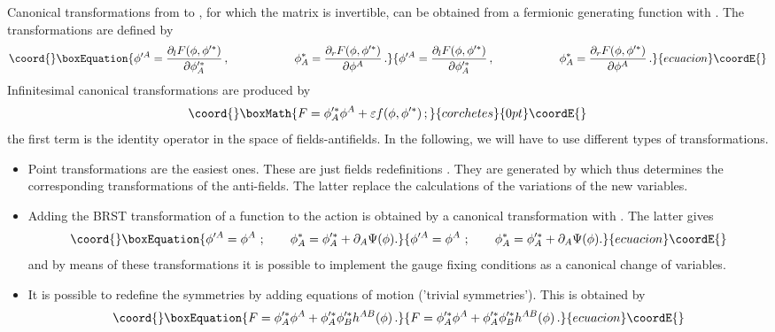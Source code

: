 \documentclass[a4paper,12pt]{article}
\begin{document}
Canonical transformations from \myHighlight{$\{\phi\, , \phi ^*\}$}\coordHE{} to \coordHE{},  
for which the matrix \coordHE{} 
is invertible, can be obtained from a fermionic generating 
function \coordHE{} with \coordHE{}. The transformations are
defined by 
\begin{equation}\coord{}\boxEquation{ \phi'^A=\frac{\partial_l F(\phi , \phi'^*)
}{\partial \phi'^*_A} \, , \hspace{2cm}
\phi^*_A=\frac{\partial_r F(\phi , \phi'^*)}{\partial \phi ^A}\,.
\label{Fcan}
}{ \phi'^A=\frac{\partial_l F(\phi , \phi'^*)
}{\partial \phi'^*_A} \, , \hspace{2cm}
\phi^*_A=\frac{\partial_r F(\phi , \phi'^*)}{\partial \phi ^A}\,.
}{ecuacion}\coordE{}\end{equation}
Infinitesimal canonical transformations are produced by 
\begin{displaymath}\coord{}\boxMath{
  F = \phi '^*_A\phi ^A + \varepsilon f(\phi,\phi'^*) \, ;
}{corchetes}{0pt}\coordE{}\end{displaymath}
the first term is the identity operator in the space of
fields-antifields. 
In the following, we will have to use different types of transformations. 
\begin{itemize}
\item Point transformations are the easiest ones. These are just
fields redefinitions \coordHE{}. They are generated 
by \coordHE{} which thus determines the corresponding
transformations of the anti-fields. The latter replace the calculations of
the variations of the new variables.

\item Adding the BRST transformation of a function \coordHE{} to the
action is obtained by a canonical transformation with \coordHE{}. The latter gives
\begin{equation}\coord{}\boxEquation{
\phi'^A = \phi^A \ ;\qquad
\phi ^*_A =\phi'^*_A + \partial _A \Psi (\phi ).
\label{gfermion}}{
\phi'^A = \phi^A \ ;\qquad
\phi ^*_A =\phi'^*_A + \partial _A \Psi (\phi ).
}{ecuacion}\coordE{}\end{equation}
and by means of these transformations it is possible to implement the
gauge fixing  
conditions as a canonical change of variables. 

\item It is possible to redefine the symmetries by adding equations of motion
('trivial symmetries'). This is obtained by
\begin{equation}\coord{}\boxEquation{\label{symm_remov}
F=\phi '^*_A\phi ^A+ \phi '^*_A\phi '^*_B h^{AB}(\phi ) \, .
}{F=\phi '^*_A\phi ^A+ \phi '^*_A\phi '^*_B h^{AB}(\phi ) \, .
}{ecuacion}\coordE{}\end{equation}
\end{itemize}
\end{document}
